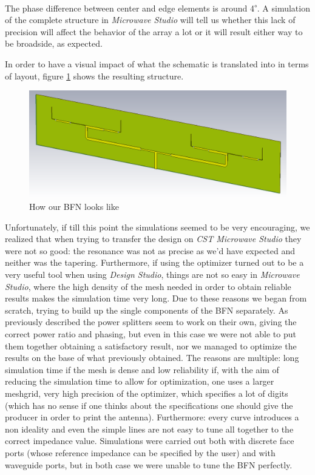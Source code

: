 \par\medskip
\noindent
The phase difference between center and edge elements is around 4\textsuperscript{$\circ$}. A simulation of the complete structure in \textit{Microwave Studio} will tell us whether this lack of precision will affect the behavior of the array a lot or it will result either way to be broadside, as expected.

\par\medskip
\noindent
In order to have a visual impact of what the schematic is translated into in terms of layout, figure \ref{layout} shows the resulting structure.

\begin{figure}[H]
\centering
\includegraphics[scale=0.45]{layout.png}
\caption{How our BFN looks like}
\label{layout}
\end{figure}

\par\medskip
\noindent
Unfortunately, if till this point the simulations seemed to be very encouraging, we realized that when trying to transfer the design on \textit{CST Microwave Studio} they were not so good: the resonance was not as precise as we'd have expected and neither was the tapering. Furthermore, if using the optimizer turned out to be a very useful tool when using \textit{Design Studio}, things are not so easy in \textit{Microwave Studio}, where the high density of the mesh needed in order to obtain reliable results makes the simulation time very long. Due to these reasons we began from scratch, trying to build up the single components of the BFN separately. As previously described the power splitters seem to work on their own, giving the correct power ratio and phasing, but even in this case we were not able to put them together obtaining a satisfactory result, nor we managed to optimize the results on the base of what previously obtained. The reasons are multiple: long simulation time if the mesh is dense and low reliability if, with the aim of reducing the simulation time to allow for optimization, one uses a larger meshgrid, very high precision of the optimizer, which specifies a lot of digits (which has no sense if one thinks about the specifications one should give the producer in order to print the antenna). Furthermore: every curve introduces a non ideality and even the simple lines are not easy to tune all together to the correct impedance value. Simulations were carried out both with discrete face ports (whose reference impedance can be specified by the user) and with waveguide ports, but in both case we were unable to tune the BFN perfectly.

